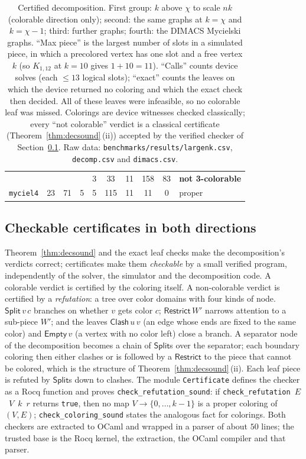 \documentclass[a4paper,fleqn]{cas-sc}
\begin{document}
\begin{table}[tb]
\begin{tabular}{@{}lccccccccl@{}}
                      &    &    &   & 3  & 33  & 11 & 158 & 83 & \textbf{not 3-colorable} \\
\texttt{myciel4}      & 23 & 71 & 5 & 5  & 115 & 11 & 11  & 0  & proper \\
\bottomrule
\end{tabular}
\caption{Certified decomposition. First group: $k$ above $\chi$ to scale $nk$
(colorable direction only); second: the same graphs at $k=\chi$ and $k=\chi-1$;
third: further graphs; fourth: the DIMACS Mycielski graphs. ``Max piece'' is the
largest number of slots in a simulated piece, in which a precolored vertex has one slot
and a free vertex $k$ (so $K_{1,12}$ at $k=10$ gives $1+10=11$). ``Calls'' counts device
solves (each $\le13$ logical slots); ``exact'' counts the leaves on which the device
returned no coloring and which the exact check then decided. All of these leaves were
infeasible, so no colorable leaf was missed. Colorings are device witnesses checked classically;
every ``not colorable'' verdict is a classical certificate
(Theorem~\ref{thm:decsound}\,(ii)) accepted by the verified checker of
Section~\ref{sec:certs}. Raw data: \texttt{benchmarks/results/largenk.csv},
\texttt{decomp.csv} and \texttt{dimacs.csv}.}
\label{tab:decomp}
\end{table}

\subsection{Checkable certificates in both directions}
\label{sec:certs}

Theorem~\ref{thm:decsound} and the exact leaf checks make the decomposition's
verdicts correct; certificates make them \emph{checkable} by a small verified program,
independently of the solver, the simulator and the decomposition code. A colorable
verdict is certified by the coloring itself. A non-colorable verdict is certified by a
\emph{refutation}: a tree over color domains with four kinds of node.
$\mathsf{Split}\,v\,c$ branches on whether $v$ gets color $c$; $\mathsf{Restrict}\,W'$
narrows attention to a sub-piece $W'$; and the leaves $\mathsf{Clash}\,u\,v$ (an edge
whose ends are fixed to the same color) and $\mathsf{Empty}\,v$ (a vertex with no
color left) close a branch. A separator node of the decomposition becomes a chain of
$\mathsf{Split}$s over the separator; each boundary coloring then either clashes or is
followed by a $\mathsf{Restrict}$ to the piece that cannot be colored, which is the
structure of Theorem~\ref{thm:decsound}\,(ii). Each leaf piece is refuted by
$\mathsf{Split}$s down to clashes. The module \texttt{Certificate} defines the checker
as a Rocq function and proves \texttt{check\_refutation\_sound}: if
\texttt{check\_refutation}~$E$~$V$~$k$~$r$ returns \texttt{true}, then no map
$V\to\{0,\dots,k-1\}$ is a proper coloring of $(V,E)$; \texttt{check\_coloring\_sound}
states the analogous fact for colorings. Both
checkers are extracted to OCaml and wrapped in a parser of about $50$ lines; the
trusted base is the Rocq kernel, the extraction, the OCaml compiler and that parser.
\end{document}
